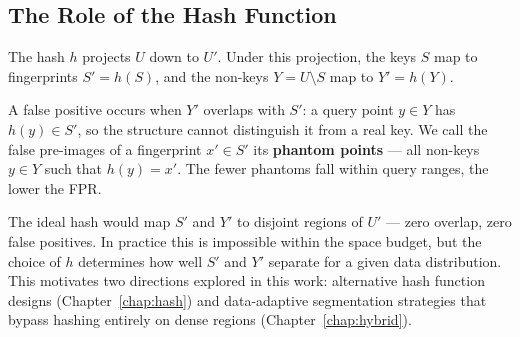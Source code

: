 \subsection{The Role of the Hash Function}
\label{sec:hash-role}

The hash $h$ projects $U$ down to $U'$.
Under this projection, the keys $S$ map to fingerprints $S' = h(S)$, and the
non-keys $Y = U \setminus S$ map to $Y' = h(Y)$.

A false positive occurs when $Y'$ overlaps with $S'$: a query point $y \in Y$ has
$h(y) \in S'$, so the structure cannot distinguish it from a real key.
We call the false pre-images of a fingerprint $x' \in S'$ its \textbf{phantom points} --- all non-keys $y \in Y$ such that $h(y) = x'$.
The fewer phantoms fall within query ranges, the lower the FPR.

The ideal hash would map $S'$ and $Y'$ to disjoint regions of $U'$ --- zero
overlap, zero false positives.
In practice this is impossible within the space budget,
but the choice of $h$ determines how well $S'$ and $Y'$ separate for a given data distribution.
This motivates two directions explored in this work: alternative hash
function designs (Chapter~\ref{chap:hash}) and data-adaptive segmentation strategies
that bypass hashing entirely on dense regions (Chapter~\ref{chap:hybrid}).
